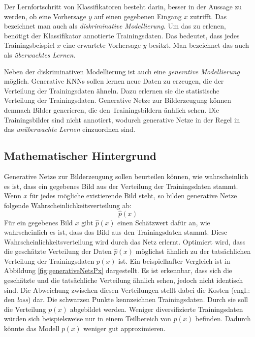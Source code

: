 \label{chap:NoGANs}

Der Lernfortschritt von Klassifikatoren besteht darin, besser in der Aussage zu werden, ob eine Vorhersage $y$ auf einen gegebenen Eingang $x$ zutrifft. Das bezeichnet man auch als \emph{diskriminative Modellierung}. Um das zu erlenen, benötigt der Klassifikator annotierte Trainingsdaten. Das bedeutet, dass jedes Trainingsbeispiel $x$ eine erwartete Vorhersage $y$ besitzt. Man bezeichnet das auch als \emph{überwachtes Lernen}. \cite{generative-modellierung}

Neben der diskriminativen Modellierung ist auch eine \emph{generative Modellierung} möglich. Generative \acp{KNN} sollen lernen neue Daten zu erzeugen, die der Verteilung der Trainingsdaten ähneln. Dazu erlernen sie die statistische Verteilung der Trainingsdaten. Generative Netze zur Bilderzeugung können demnach Bilder generieren, die den Trainingsbildern änhlich sehen. Die Trainingsbilder sind nicht annotiert, wodurch generative Netze in der Regel in das \emph{unüberwachte Lernen} einzuordnen sind. \cite{generative-modellierung}

\subsection{Mathematischer Hintergrund}
Generative Netze zur Bilderzeugung sollen beurteilen können, wie wahrscheinlich es ist, dass ein gegebenes Bild aus der Verteilung der Trainingsdaten stammt. Wenn $x$ für jedes mögliche existierende Bild steht, so bilden generative Netze folgende Wahrscheinlichkeitsverteilung ab: \cite{generative-modellierung}
\begin{equation}
   \hat{p}(x)
\end{equation}
Für ein gegebenes Bild $x$ gibt $\hat{p}(x)$ einen Schätzwert dafür an, wie wahrscheinlich es ist, dass das Bild aus den Trainingsdaten stammt. Diese Wahrscheinlichkeitsverteilung wird durch das Netz erlernt. Optimiert wird, dass die geschätzte Verteilung der Daten $\hat{p}(x)$ möglichst ähnlich zu der tatsächlichen Verteilung der Trainingsdaten $p(x)$ ist. Ein beispielhafter Vergleich ist in Abbildung \ref{fig:generativeNetsPx} dargestellt. Es ist erkennbar, dass sich die geschätzte und die tatsächliche Verteilung ähnlich sehen, jedoch nicht identisch sind. Die Abweichung zwischen diesen Verteilungen stellt dabei die Kosten (engl.: den \emph{loss}) dar. Die schwarzen Punkte kennzeichnen Trainingsdaten. Durch sie soll die Verteilung $p(x)$ abgebildet werden. Weniger diversifizierte Trainingsdaten würden sich beispielsweise nur in einem Teilbereich von $p(x)$ befinden. Dadurch könnte das Modell $p(x)$ weniger gut approximieren. \cite{generative-modellierung} \cite{openAiGenerativeNets}

